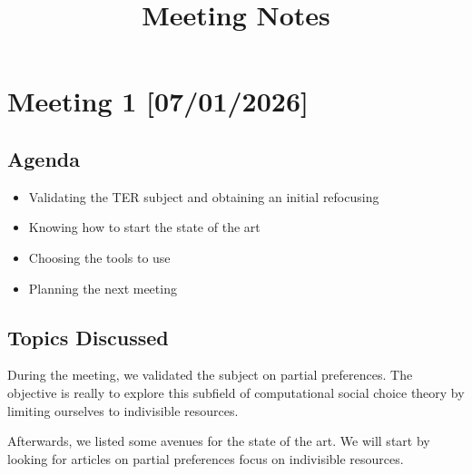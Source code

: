 \documentclass{article}
\title{Meeting Notes}
\author{}
\date{}
\begin{document}
\maketitle
\tableofcontents
\newpage

\section{Meeting 1 [07/01/2026]}

\subsection{Agenda}
\begin{itemize}
    \item Validating the TER subject and obtaining an initial refocusing
    \item Knowing how to start the state of the art
    \item Choosing the tools to use
    \item Planning the next meeting
\end{itemize}

\subsection{Topics Discussed}

During the meeting, we validated the subject on partial preferences. The objective is really to explore this subfield of computational social choice theory by limiting ourselves to indivisible resources.

Afterwards, we listed some avenues for the state of the art. We will start by looking for articles on partial preferences focus on indivisible resources.
\end{document}

